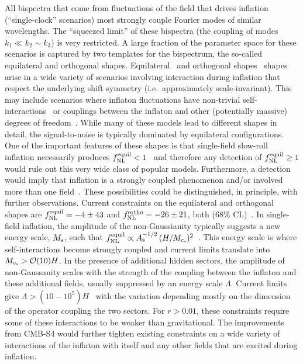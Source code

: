 All bispectra that come from fluctuations of the field that drives inflation (``single-clock'' scenarios) most strongly couple Fourier modes of similar wavelengths. The ``squeezed limit'' of these bispectra (the coupling of modes $k_1\ll k_2\sim k_3$) is very restricted. A large fraction of the parameter space for these scenarios is captured by two templates for the bispectrum, the so-called equilateral and orthogonal shapes.  Equilateral~\cite{Babich:2004gb} and orthogonal shapes~\cite{Senatore:2009gt} shapes arise in a wide variety of scenarios involving interaction during inflation that respect the underlying shift symmetry (i.e.~approximately scale-invariant).  This may include scenarios where inflaton fluctuations have non-trivial self-interactions~\cite{Silverstein:2003hf,ArkaniHamed:2003uz,Alishahiha:2004eh,Chen:2006nt,Cheung:2007st,Senatore:2009gt} or couplings between the inflaton and other (potentially massive) degrees of freedom~\cite{Chen:2009zp,Tolley:2009fg, Cremonini:2010ua, Achucarro:2010da,Baumann:2011nk,Barnaby:2011pe,Arkani-Hamed:2015bza}.  While many of these models lead to different shapes in detail, the signal-to-noise is typically dominated by equilateral configurations.  One of the important features of these shapes is that single-field slow-roll inflation necessarily produces $f_{\rm NL}^{\rm equil} < 1$~\cite{Creminelli:2003iq} and therefore any detection of $f_{\rm NL}^{\rm equil} \geq 1$ would rule out this very wide class of popular models.  Furthermore, a detection would imply that inflation is a strongly coupled phenomenon and/or involved more than one field~\cite{Baumann:2014cja,Alvarez:2014vva,Baumann:2015nta}.  These possibilities could be distinguished, in principle, with further observations.  Current constraints on the equilateral and orthogonal shapes are $f_{\rm NL}^{\rm equil} = -4 \pm 43$ and $f_{\rm NL}^{\rm ortho} = -26 \pm 21$, both (68\% CL)~\cite{Ade:2015ava}. In single-field inflation, the amplitude of the non-Gaussianity typically suggests a new energy scale, $M_{\rm s}$, such that  $f_{\rm NL}^{\rm equil} \propto A_{\rm s}^{-1/2} \, (H/M_{c_{\rm s}})^2$~\cite{Cheung:2007st,Baumann:2011su}. This energy scale is where self-interactions become strongly coupled and current limits translate into $M_{c_{\rm s}}>\mathcal{O}(10)H$.  In the presence of additional hidden sectors, the amplitude of non-Gaussanity scales with the strength of the coupling between the inflaton and these additional fields, usually suppressed by an energy scale $\Lambda$.  Current limits give $\Lambda  > (10-10^{5}) H$~\cite{Green:2013rd,Assassi:2013gxa} with the variation depending mostly on the dimension of the operator coupling the two sectors.  For $r > 0.01$, these constraints require some of these interactions to be weaker than gravitational.  The improvements from CMB-S4 would further tighten existing constraints on a wide variety of interactions of the inflaton with itself and any other fields that are excited during inflation.    

